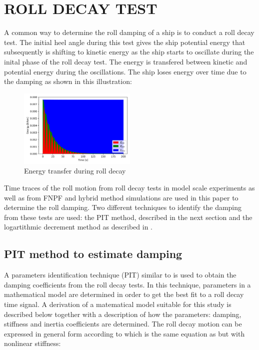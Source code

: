 \section*{ROLL DECAY TEST}\label{roll-decay-test}

    A common way to determine the roll damping of a ship is to conduct a
roll decay test. The initial heel angle during this test gives the ship
potential energy that subsequently is shifting to kinetic energy as the
ship starts to oscillate during the inital phase of the roll decay test.
The energy is transfered between kinetic and potential energy during the
oscillations. The ship loses energy over time due to the damping as
shown in this illustration:
 
            
    
    \begin{figure}[H]
        \begin{center}\includegraphics[width = 0.5\textwidth]{figures/energy.png}\end{center}
        \vspace{-1cm}
        \caption{Energy transfer during roll decay}
        \label{fig:energy}
    \end{figure}
    

    Time traces of the roll motion from roll decay tests in model scale
experiments as well as from FNPF and hybrid method simulations are used
in this paper to determine the roll damping. Two different techniques to
identify the damping from these tests are used: the PIT method,
described in the next section and the logartithmic decrement method as
described in \citep{7505983/BYNJ8CFG}.
    \subsection*{PIT method to estimate
damping}\label{pit-method-to-estimate-damping}

    A parameters identification technique (PIT) similar to
\citep{7505983/EXYJELCU} is used to obtain the damping coefficients from
the roll decay tests. In this technique, parameters in a mathematical
model are determined in order to get the best fit to a roll decay time
signal. A derivation of a matematical model suitable for this study is
described below together with a description of how the parameters:
damping, stiffness and inertia coefficients are determined. The roll
decay motion can be expressed in general form according to
\citep{7505983/KL7A3RIV} which is the same equation as
\citep{7505983/FB64RGPF} but with nonlinear stiffness:
 

